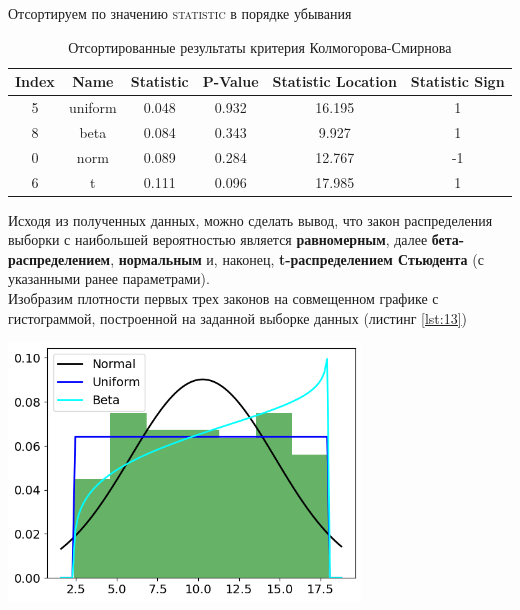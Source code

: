 \documentclass[a4paper, 14pt]{extarticle}
\begin{document}
\vspace{20pt}

Отсортируем по значению \textsc{statistic} в порядке убывания

\begin{table}[h!]
    \centering
    \renewcommand{\arraystretch}{1.5}
    \begin{adjustbox}{max width=0.8\textwidth}
        \begin{tabular}{|c|c|c|c|c|c|}
        \hline
        \textbf{Index} & \textbf{Name} & \textbf{Statistic} & \textbf{P-Value} & \textbf{Statistic Location} & \textbf{Statistic Sign} \\
        \hline
        5 & uniform & 0.048 & 0.932 & 16.195 & 1 \\
        \hline
        8 & beta & 0.084 & 0.343 & 9.927 & 1 \\
        \hline
        0 & norm & 0.089 & 0.284 & 12.767 & -1 \\
        \hline
        6 & t & 0.111 & 0.096 & 17.985 & 1 \\
        \hline
        \end{tabular}
    \end{adjustbox}
    \caption{Отсортированные результаты критерия Колмогорова-Смирнова}
    \label{tab:statistical_data3}
\end{table}

\vspace{20pt}

Исходя из полученных данных, можно сделать вывод, что закон распределения выборки
с наибольшей вероятностью является \textbf{равномерным}, далее \textbf{бета-распределением},
\textbf{нормальным} и, наконец, \textbf{t-распределением Стьюдента} (с указанными ранее
параметрами).\\

Изобразим плотности первых трех законов на совмещенном графике с гистограммой, построенной
на заданной выборке данных (листинг \ref{lst:13})

\begin{center}
    \includegraphics[width=0.7\textwidth]{LW1_25_0.png}
\end{center}
\end{document}
